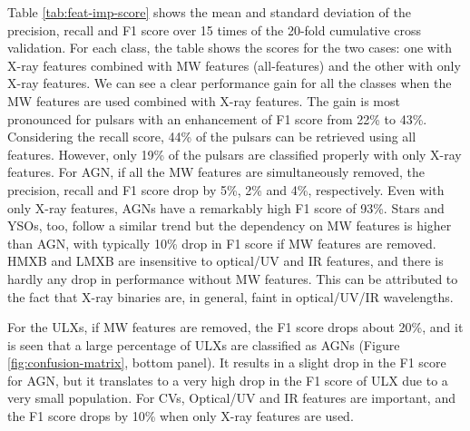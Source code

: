 \documentclass[fleqn,usenatbib]{mnras}
\begin{document}
    Table \ref{tab:feat-imp-score} shows the mean and standard deviation of the precision, recall and F1 score over 15 times of the 20-fold cumulative cross validation. For each class, the table shows the scores for the two cases: one with X-ray features combined with MW features (all-features) and the other with only X-ray features. We can see a clear performance gain for all the classes when the MW features are used combined with X-ray features. The gain is most pronounced for pulsars with an enhancement of F1 score from 22\% to 43\%. Considering the recall score, 44\% of the pulsars can be retrieved using all features. However, only 19\% of the pulsars are classified properly with only X-ray features. For AGN, if all the MW features are simultaneously removed, the precision, recall and F1 score drop by 5\%, 2\% and 4\%, respectively. Even with only X-ray features, AGNs have a remarkably high F1 score of 93\%. Stars and YSOs, too, follow a similar trend but the dependency on MW features is higher than AGN, with typically 10\% drop in F1 score if MW features are removed. HMXB and LMXB are insensitive to optical/UV and IR features, and there is hardly any drop in performance without MW features. This can be attributed to the fact that X-ray binaries are, in general, faint in optical/UV/IR wavelengths. 
    
    For the ULXs, if MW features are removed, the F1 score drops about 20\%, and it is seen that a large percentage of ULXs are classified as AGNs (Figure \ref{fig:confusion-matrix}, bottom panel). It results in a slight drop in the F1 score for AGN, but it translates to a very high drop in the F1 score of ULX due to a very small population. For CVs, Optical/UV and IR features are important, and the F1 score drops by 10\% when only X-ray features are used. 
\end{document}
